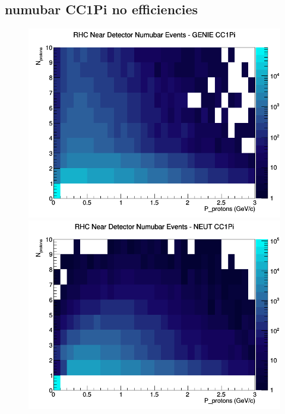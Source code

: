 \documentclass[12pt]{article}
\begin{document}
\subsection{numubar CC1Pi no efficiencies}
\begin{figure}[h]
\includegraphics[width=\linewidth]{N_P/nominal/protons/CC1Pi_RHC_ND_numubar_N_P_GENIE.png}
\endminipage
{}
\includegraphics[width=\linewidth]{N_P/nominal/protons/CC1Pi_RHC_ND_numubar_N_P_NEUT.png}
\endminipage
{}

\end{figure}
\end{document}
